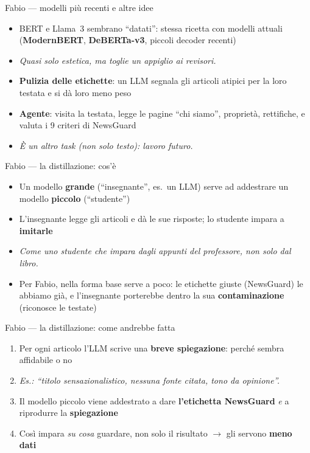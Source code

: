 \documentclass[aspectratio=169]{beamer}
\newcommand{\hl}[1]{\textbf{#1}}
\begin{document}
\begin{frame}{Fabio --- modelli pi\`u recenti e altre idee}
  \vfill
  \begin{itemize}[<+->]
    \setlength\itemsep{0.7em}
    \item BERT e Llama~3 sembrano ``datati'': stessa ricetta con modelli attuali (\hl{ModernBERT}, \hl{DeBERTa-v3}, piccoli decoder recenti)
    \item[] {\small\itshape Quasi solo estetica, ma toglie un appiglio ai revisori.}
    \item \hl{Pulizia delle etichette}: un LLM segnala gli articoli atipici per la loro testata e si d\`a loro meno peso
    \item \hl{Agente}: visita la testata, legge le pagine ``chi siamo'', propriet\`a, rettifiche, e valuta i 9 criteri di NewsGuard
    \item[] {\small\itshape \`E un altro task (non solo testo): lavoro futuro.}
  \end{itemize}
  \vfill
\end{frame}

\begin{frame}{Fabio --- la distillazione: cos'\`e}
  \vfill
  \begin{itemize}[<+->]
    \setlength\itemsep{0.8em}
    \item Un modello \hl{grande} (``insegnante'', es.\ un LLM) serve ad addestrare un modello \hl{piccolo} (``studente'')
    \item L'insegnante legge gli articoli e d\`a le sue risposte; lo studente impara a \hl{imitarle}
    \item[] {\small\itshape Come uno studente che impara dagli appunti del professore, non solo dal libro.}
    \item Per Fabio, nella forma base serve a poco: le etichette giuste (NewsGuard) le abbiamo gi\`a, e l'insegnante porterebbe dentro la sua \hl{contaminazione} (riconosce le testate)
  \end{itemize}
  \vfill
\end{frame}

\begin{frame}{Fabio --- la distillazione: come andrebbe fatta}
  \vfill
  \begin{enumerate}[<+->]
    \setlength\itemsep{0.8em}
    \item Per ogni articolo l'LLM scrive una \hl{breve spiegazione}: perch\'e sembra affidabile o no
    \item[] {\small\itshape Es.: ``titolo sensazionalistico, nessuna fonte citata, tono da opinione''.}
    \item Il modello piccolo viene addestrato a dare \hl{l'etichetta NewsGuard} \emph{e} a riprodurre la \hl{spiegazione}
    \item Cos\`i impara \emph{su cosa} guardare, non solo il risultato $\rightarrow$ gli servono \hl{meno dati}
  \end{enumerate}
  \vspace{0.6em}
  \vfill
\end{frame}
\end{document}
